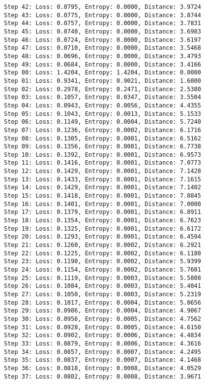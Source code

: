 \documentclass[11pt]{article}
\begin{document}
\begin{Verbatim}[commandchars=\\\{\}]
Step 42: Loss: 0.0795, Entropy: 0.0000, Distance: 3.9724
Step 43: Loss: 0.0775, Entropy: 0.0000, Distance: 3.8744
Step 44: Loss: 0.0757, Entropy: 0.0000, Distance: 3.7831
Step 45: Loss: 0.0740, Entropy: 0.0000, Distance: 3.6983
Step 46: Loss: 0.0724, Entropy: 0.0000, Distance: 3.6197
Step 47: Loss: 0.0710, Entropy: 0.0000, Distance: 3.5468
Step 48: Loss: 0.0696, Entropy: 0.0000, Distance: 3.4793
Step 49: Loss: 0.0684, Entropy: 0.0000, Distance: 3.4166
Step 00: Loss: 1.4204, Entropy: 1.4204, Distance: 0.0000
Step 01: Loss: 0.9341, Entropy: 0.9021, Distance: 1.6000
Step 02: Loss: 0.2978, Entropy: 0.2471, Distance: 2.5380
Step 03: Loss: 0.1057, Entropy: 0.0347, Distance: 3.5504
Step 04: Loss: 0.0943, Entropy: 0.0056, Distance: 4.4355
Step 05: Loss: 0.1043, Entropy: 0.0013, Distance: 5.1533
Step 06: Loss: 0.1149, Entropy: 0.0004, Distance: 5.7240
Step 07: Loss: 0.1236, Entropy: 0.0002, Distance: 6.1716
Step 08: Loss: 0.1305, Entropy: 0.0001, Distance: 6.5162
Step 09: Loss: 0.1356, Entropy: 0.0001, Distance: 6.7738
Step 10: Loss: 0.1392, Entropy: 0.0001, Distance: 6.9573
Step 11: Loss: 0.1416, Entropy: 0.0001, Distance: 7.0773
Step 12: Loss: 0.1429, Entropy: 0.0001, Distance: 7.1428
Step 13: Loss: 0.1433, Entropy: 0.0001, Distance: 7.1615
Step 14: Loss: 0.1429, Entropy: 0.0001, Distance: 7.1402
Step 15: Loss: 0.1418, Entropy: 0.0001, Distance: 7.0845
Step 16: Loss: 0.1401, Entropy: 0.0001, Distance: 7.0000
Step 17: Loss: 0.1379, Entropy: 0.0001, Distance: 6.8911
Step 18: Loss: 0.1354, Entropy: 0.0001, Distance: 6.7623
Step 19: Loss: 0.1325, Entropy: 0.0001, Distance: 6.6172
Step 20: Loss: 0.1293, Entropy: 0.0001, Distance: 6.4594
Step 21: Loss: 0.1260, Entropy: 0.0002, Distance: 6.2921
Step 22: Loss: 0.1225, Entropy: 0.0002, Distance: 6.1180
Step 23: Loss: 0.1190, Entropy: 0.0002, Distance: 5.9399
Step 24: Loss: 0.1154, Entropy: 0.0002, Distance: 5.7601
Step 25: Loss: 0.1119, Entropy: 0.0003, Distance: 5.5808
Step 26: Loss: 0.1084, Entropy: 0.0003, Distance: 5.4041
Step 27: Loss: 0.1050, Entropy: 0.0003, Distance: 5.2319
Step 28: Loss: 0.1017, Entropy: 0.0004, Distance: 5.0656
Step 29: Loss: 0.0986, Entropy: 0.0004, Distance: 4.9067
Step 30: Loss: 0.0956, Entropy: 0.0005, Distance: 4.7562
Step 31: Loss: 0.0928, Entropy: 0.0005, Distance: 4.6150
Step 32: Loss: 0.0902, Entropy: 0.0006, Distance: 4.4834
Step 33: Loss: 0.0879, Entropy: 0.0006, Distance: 4.3616
Step 34: Loss: 0.0857, Entropy: 0.0007, Distance: 4.2495
Step 35: Loss: 0.0837, Entropy: 0.0007, Distance: 4.1468
Step 36: Loss: 0.0818, Entropy: 0.0008, Distance: 4.0529
Step 37: Loss: 0.0802, Entropy: 0.0008, Distance: 3.9671

\end{Verbatim}
\end{document}
